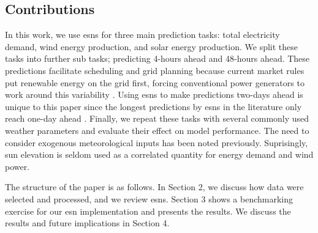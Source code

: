 \subsection{Contributions}
In this work, we use \glspl{esn} for three main prediction tasks: total
electricity demand, wind energy production, and solar energy production. We
split these tasks into further sub tasks; predicting 4-hours ahead and 48-hours
ahead. These predictions facilitate scheduling and grid planning
because current market rules put renewable energy on the grid first, forcing
conventional power generators to work around this variability
\cite{wang_quantifying_2016}. Using \glspl{esn} to make predictions two-days
ahead is unique to this paper since the longest predictions by \glspl{esn} in
the literature only reach one-day ahead \cite{deihimi_application_2012}.
Finally, we repeat these tasks with several commonly used weather parameters
and evaluate their effect on model performance. The need to consider exogenous
meteorological inputs has been noted previously. Suprisingly, sun elevation is
seldom used as a correlated quantity for energy demand and wind power.

The structure of the paper is as follows. In Section 2, we discuss how data
were selected and processed, and we review \glspl{esn}. Section 3 shows a
benchmarking
exercise for our \gls{esn} implementation and presents the results. We discuss
the results and future implications in Section 4.
